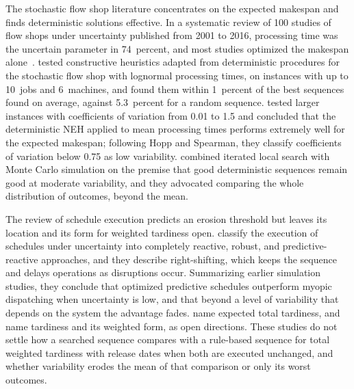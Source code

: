 \sumpara The stochastic flow shop literature concentrates on the expected makespan and finds deterministic solutions effective. \sumparaend
\fin In a systematic review of 100 studies of flow shops under uncertainty published from 2001 to 2016, processing time was the uncertain parameter in 74~percent, and most studies optimized the makespan alone~\cite{gonzalezneira2017review}. \fine
\fin \citet{baker2012stochastic} tested constructive heuristics adapted from deterministic procedures for the stochastic flow shop with lognormal processing times, on instances with up to 10~jobs and 6~machines, and found them within 1~percent of the best sequences found on average, against 5.3~percent for a random sequence. \fine
\fin \citet{framinan2015stochastic} tested larger instances with coefficients of variation from 0.01 to 1.5 and concluded that the deterministic NEH applied to mean processing times performs extremely well for the expected makespan; following Hopp and Spearman, they classify coefficients of variation below 0.75 as low variability. \fine
\fin \citet{juan2014simheuristic} combined iterated local search with Monte Carlo simulation on the premise that good deterministic sequences remain good at moderate variability, and they advocated comparing the whole distribution of outcomes, beyond the mean. \fine

\sumpara The review of schedule execution predicts an erosion threshold but leaves its location and its form for weighted tardiness open. \sumparaend
\fin \citet{aytug2005executing} classify the execution of schedules under uncertainty into completely reactive, robust, and predictive-reactive approaches, and they describe right-shifting, which keeps the sequence and delays operations as disruptions occur. \fine
\fin Summarizing earlier simulation studies, they conclude that optimized predictive schedules outperform myopic dispatching when uncertainty is low, and that beyond a level of variability that depends on the system the advantage fades. \fine
\fin \citet{baker2012stochastic} name expected total tardiness, and \citet{gonzalezneira2017review} name tardiness and its weighted form, as open directions. \fine
\fin These studies do not settle how a searched sequence compares with a rule-based sequence for total weighted tardiness with release dates when both are executed unchanged, and whether variability erodes the mean of that comparison or only its worst outcomes. \fine
